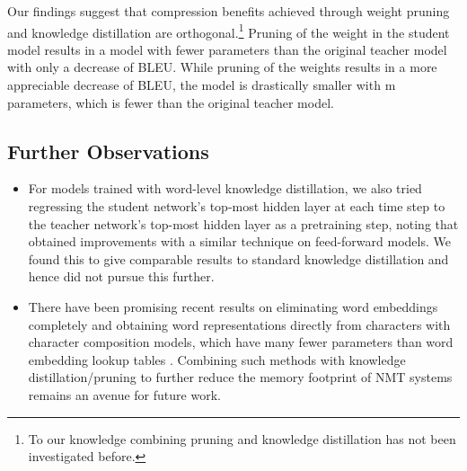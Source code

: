 \documentclass[11pt,letterpaper]{article}
\begin{document}
Our findings suggest that compression benefits achieved through 
weight pruning and knowledge distillation are 
orthogonal.\footnote{To our knowledge combining pruning and knowledge distillation has not been investigated before.}
 Pruning 
 of the weight in the  student model results in a model with  fewer parameters than the original teacher 
model with only a decrease of  BLEU.
 While pruning  of the weights results in a more appreciable decrease of  BLEU, 
the model is drastically smaller with m parameters, which is  fewer than the original teacher model.


\subsection{Further Observations}
\begin{itemize}
\item For models trained with word-level knowledge distillation, we also tried regressing the student network's
top-most hidden layer at each time step to the teacher network's top-most hidden layer as
a pretraining step, noting that  obtained improvements with a 
similar technique on feed-forward models.
We found this to give comparable results to standard knowledge distillation and 
hence did not pursue this further.
\item There have been promising recent results
on eliminating word embeddings completely
and obtaining word representations directly from characters 
with character composition models, which have many fewer parameters than word embedding
lookup tables
\cite{Ling2015,Kim2016,Ling2015b,Jozefowicz2016,Jussa2016}. 
Combining such methods with knowledge distillation/pruning 
to further reduce the memory footprint of
NMT systems remains an avenue for future work.
\end{itemize}
\end{document}
